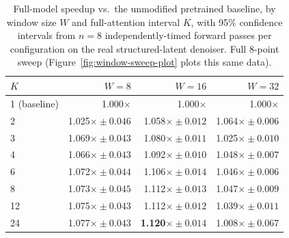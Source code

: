\documentclass[11pt]{article}
\begin{document}
\begin{table}[t]
    \centering
    \caption{Full-model speedup vs.\ the unmodified pretrained baseline, by window size $W$ and
    full-attention interval $K$, with 95\% confidence intervals from $n=8$ independently-timed
    forward passes per configuration on the real structured-latent denoiser. Full 8-point sweep
    (Figure~\ref{fig:window-sweep-plot} plots this same data).}
    \label{tab:window-sweep}
    \begin{tabular}{@{}lrrr@{}}
        \toprule
        $K$ & $W=8$ & $W=16$ & $W=32$ \\
        \midrule
        1 (baseline) & 1.000$\times$ & 1.000$\times$ & 1.000$\times$ \\
        2  & 1.025$\times \pm 0.046$ & 1.058$\times \pm 0.012$ & 1.064$\times \pm 0.006$ \\
        3  & 1.069$\times \pm 0.043$ & 1.080$\times \pm 0.011$ & 1.025$\times \pm 0.010$ \\
        4  & 1.066$\times \pm 0.043$ & 1.092$\times \pm 0.010$ & 1.048$\times \pm 0.007$ \\
        6  & 1.072$\times \pm 0.044$ & 1.106$\times \pm 0.014$ & 1.046$\times \pm 0.006$ \\
        8  & 1.073$\times \pm 0.045$ & 1.112$\times \pm 0.013$ & 1.047$\times \pm 0.009$ \\
        12 & 1.075$\times \pm 0.043$ & 1.112$\times \pm 0.012$ & 1.039$\times \pm 0.011$ \\
        24 & 1.077$\times \pm 0.043$ & \textbf{1.120$\times \pm 0.014$} & 1.008$\times \pm 0.067$ \\
        \bottomrule
    \end{tabular}
\end{table}
\end{document}
